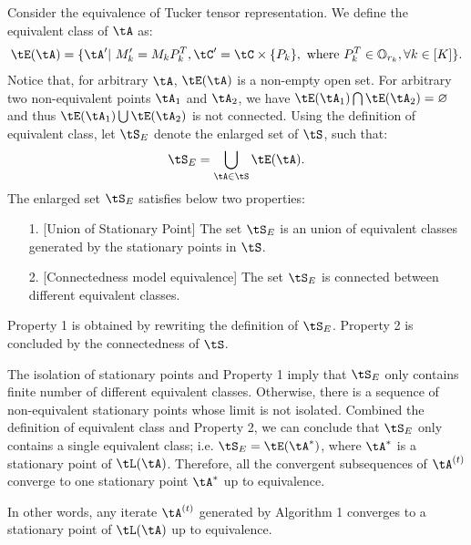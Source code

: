 \documentclass[11pt]{article}
\begin{document}
 
 Consider the equivalence of Tucker tensor representation. We define the equivalent class of $\tA$ as:
 \begin{align*}
 	\tE(\tA) = \{ \tA'|\ M'_k = M_kP^T_k, \tC' = \tC \times \{P_k\}, \text{ where } P^T_k \in \mathbb{O}_{r_k}, \forall k \in [K] \}.
 \end{align*}
  Notice that, for arbitrary $\tA$, $\tE(\tA)$ is a non-empty open set. For arbitrary two non-equivalent points $\tA_1$ and $\tA_2$, we have $\tE(\tA_1) \bigcap \tE(\tA_2) = \varnothing$ and thus $\tE(\tA_1) \bigcup \tE(\tA_2)$ is not connected. Using the definition of equivalent class, let $\tS_E$ denote the enlarged set of $\tS$, such that:
 \begin{align*}
 	\tS_E = \bigcup_{\tA \in \tS} \tE(\tA).
 \end{align*} 
The enlarged set $\tS_E$ satisfies below two properties:
 \begin{enumerate}
 \vspace{-.5cm}
 	\item [1.] [Union of Stationary Point] The set $\tS_E$ is an union of equivalent  classes generated by the stationary points in $\tS$.
 	\item [2.] [Connectedness model equivalence]  The set $\tS_E$ is connected between different equivalent classes.
\vspace{-.5cm}
 \end{enumerate}
 
Property 1 is obtained by rewriting the definition of $\tS_E$. Property 2 is concluded by the connectedness of $\tS$. 
 
 The isolation of stationary points and Property 1 imply that $\tS_E$  only contains finite number of different equivalent classes. Otherwise, there is a sequence of non-equivalent stationary points whose limit is not isolated. Combined the definition of equivalent class and Property 2, we can conclude that $\tS_E$ only contains a single equivalent class; i.e. $\tS_E = \tE(\tA^*)$, where $\tA^*$ is a stationary point of $\tL(\tA)$. Therefore, all the convergent subsequences of $\tA^{(t)}$ converge to one stationary point $\tA^*$ up to equivalence. 
 
 In other words, any iterate $\tA^{(t)}$ generated by Algorithm 1 converges to a stationary point of $\tL(\tA)$ up to equivalence.
 
\end{document}
